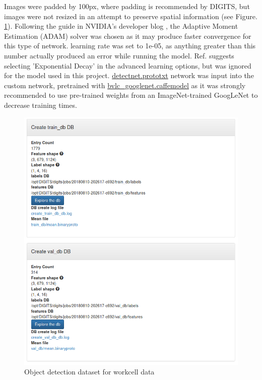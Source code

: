 \documentclass[10pt,journal,compsoc]{IEEEtran}
\begin{document}
Images were padded by 100px, where padding is recommended by DIGITS, but images were not resized in an attempt to preserve spatial information (see Figure. \ref{workcell2Data}). Following the guide in NVIDIA's developer blog \cite{DNwDIGITS}, the Adaptive Moment Estimation (ADAM) solver was chosen as it may produce faster convergence for this type of network. learning rate was set to 1e-05, as anything greater than this number actually produced an error while running the model. Ref. \cite{DNwDIGITS} suggests selecting
'Exponential Decay' in the advanced learning options, but was ignored for the model used in this project. \href{https://github.com/dusty-nv/jetson-inference/blob/master/data/networks/detectnet.prototxt}{detectnet.prototxt} network was input into the custom network, pretrained with \href{http://dl.caffe.berkeleyvision.org/bvlc_googlenet.caffemodel}{bvlc\_googlenet.caffemodel} as it was strongly recommended to use pre-trained weights from an ImageNet-trained GoogLeNet \cite{DNwDIGITS} to decrease training times.

\begin{figure}[thpb]
  \centering
  \includegraphics[width=\linewidth]{../img/Workcell2-Object-Detection/dataset/Workcell2-detectNet-Dataset3.png}
  \caption{Object detection dataset for workcell data}
  \label{workcell2Data}
\end{figure}
\end{document}
